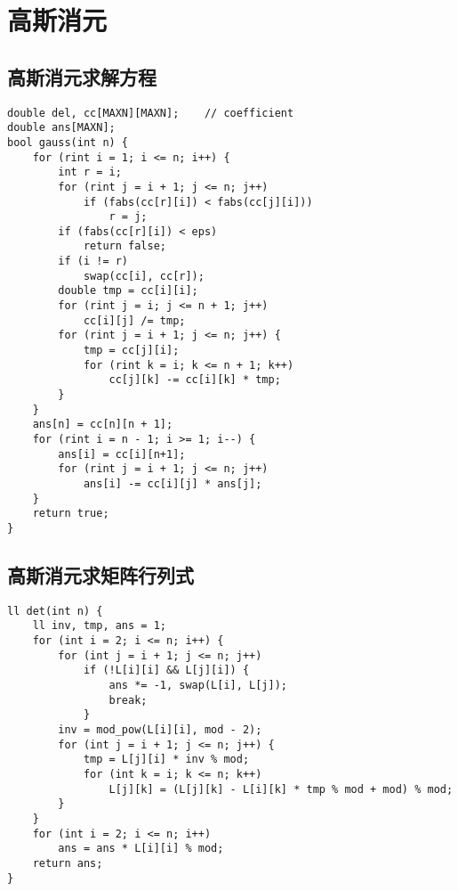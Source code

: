 \section{高斯消元}
\subsection{高斯消元求解方程}
\begin{verbatim}
double del, cc[MAXN][MAXN];    // coefficient
double ans[MAXN];
bool gauss(int n) {
    for (rint i = 1; i <= n; i++) {
        int r = i;
        for (rint j = i + 1; j <= n; j++)
            if (fabs(cc[r][i]) < fabs(cc[j][i]))
                r = j;
        if (fabs(cc[r][i]) < eps)
            return false;
        if (i != r)
            swap(cc[i], cc[r]);
        double tmp = cc[i][i];
        for (rint j = i; j <= n + 1; j++)
            cc[i][j] /= tmp;
        for (rint j = i + 1; j <= n; j++) {
            tmp = cc[j][i];
            for (rint k = i; k <= n + 1; k++)
                cc[j][k] -= cc[i][k] * tmp;
        }
    }
    ans[n] = cc[n][n + 1];
    for (rint i = n - 1; i >= 1; i--) {
        ans[i] = cc[i][n+1];
        for (rint j = i + 1; j <= n; j++)
            ans[i] -= cc[i][j] * ans[j];
    }
    return true;
}
\end{verbatim}

\subsection{高斯消元求矩阵行列式}
\begin{verbatim}
ll det(int n) {
    ll inv, tmp, ans = 1;
    for (int i = 2; i <= n; i++) {
        for (int j = i + 1; j <= n; j++)
            if (!L[i][i] && L[j][i]) {
                ans *= -1, swap(L[i], L[j]);
                break;
            }
        inv = mod_pow(L[i][i], mod - 2);
        for (int j = i + 1; j <= n; j++) {
            tmp = L[j][i] * inv % mod;
            for (int k = i; k <= n; k++)
                L[j][k] = (L[j][k] - L[i][k] * tmp % mod + mod) % mod;
        }
    }
    for (int i = 2; i <= n; i++)
        ans = ans * L[i][i] % mod;
    return ans;
}
\end{verbatim}
